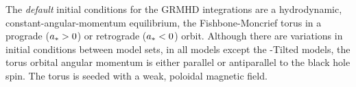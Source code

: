 The \emph{default} initial conditions for the GRMHD integrations are a hydrodynamic, constant-angular-momentum equilibrium, the Fishbone-Moncrief torus \citep{1976ApJ...207..962F}
in a prograde ($a_* > 0$) or retrograde ($a_* < 0$) orbit.  Although there are variations in initial conditions between model sets, in all models except the \hamr-Tilted models, the torus orbital angular momentum is either parallel or antiparallel to the black hole spin. %
The torus is seeded with a weak, poloidal magnetic field.

